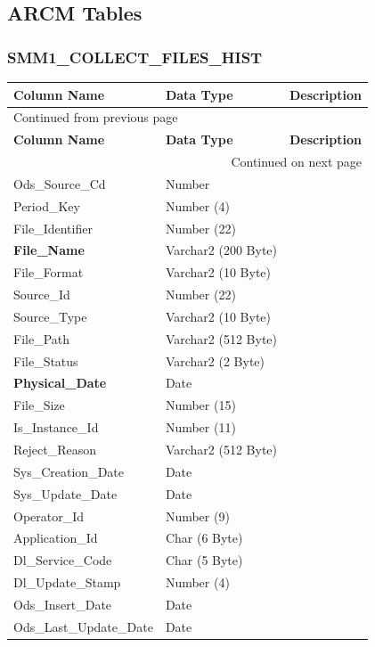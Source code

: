 \documentclass[12pt,twoside]{article}
\begin{document}
\subsection{ARCM Tables}
\label{sec:orgheadline135}
\subsubsection{SMM1\_COLLECT\_FILES\_HIST}
\label{sec:orgheadline132}
\footnotesize

\begin{longtable}{l|l|l}
\hline
\textbf{Column Name} & \textbf{Data Type} & \textbf{Description}\\
\hline
\endfirsthead
\multicolumn{3}{l}{Continued from previous page} \\
\hline

\textbf{Column Name} & \textbf{Data Type} & \textbf{Description} \\

\hline
\endhead
\hline\multicolumn{3}{r}{Continued on next page} \\
\endfoot
\endlastfoot
\hline
Ods\_Source\_Cd & Number & \\
Period\_Key & Number (4) & \\
File\_Identifier & Number (22) & \\
\textbf{File\_Name} & Varchar2 (200 Byte) & \\
File\_Format & Varchar2 (10 Byte) & \\
Source\_Id & Number (22) & \\
Source\_Type & Varchar2 (10 Byte) & \\
File\_Path & Varchar2 (512 Byte) & \\
File\_Status & Varchar2 (2 Byte) & \\
\textbf{Physical\_Date} & Date & \\
File\_Size & Number (15) & \\
Is\_Instance\_Id & Number (11) & \\
Reject\_Reason & Varchar2 (512 Byte) & \\
Sys\_Creation\_Date & Date & \\
Sys\_Update\_Date & Date & \\
Operator\_Id & Number (9) & \\
Application\_Id & Char (6 Byte) & \\
Dl\_Service\_Code & Char (5 Byte) & \\
Dl\_Update\_Stamp & Number (4) & \\
Ods\_Insert\_Date & Date & \\
Ods\_Last\_Update\_Date & Date & \\
\hline
\end{longtable}
\end{document}
